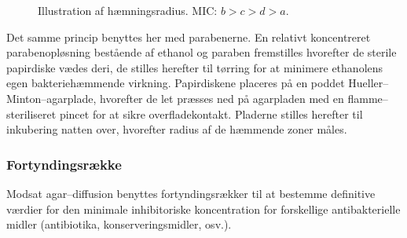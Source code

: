     \begin{figure}[H]\centering
        \caption{Illustration af hæmningsradius. MIC: $b>c>d>a$.}
    \end{figure}
    Det samme princip benyttes her med parabenerne. En relativt koncentreret parabenopløsning bestående af ethanol og paraben fremstilles hvorefter de sterile papirdiske vædes deri, de stilles herefter til tørring for at minimere ethanolens egen bakteriehæmmende virkning. Papirdiskene placeres på en poddet Hueller--Minton--agarplade, hvorefter de let præsses ned på agarpladen med en flamme--steriliseret pincet for at sikre overfladekontakt. Pladerne stilles herefter til inkubering natten over, hvorefter radius af de hæmmende zoner måles.

    \subsubsection{Fortyndingsrække}
    Modsat agar--diffusion benyttes fortyndingsrækker til at bestemme definitive værdier for den minimale inhibitoriske koncentration for forskellige antibakterielle midler (antibiotika, konserveringsmidler, osv.). 

